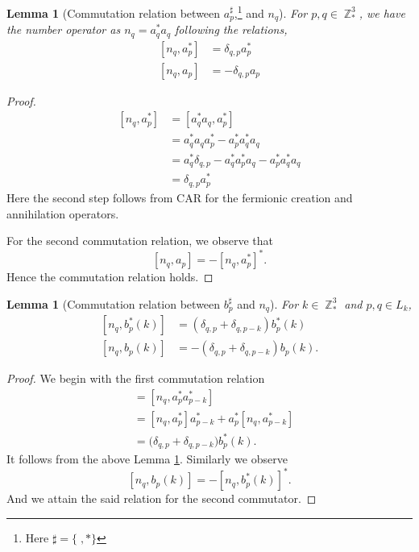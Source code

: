 \documentclass[sn-mathphys, Numbered ,a4paper]{sn-jnl}%
\DeclareMathOperator{\Z}{\mathbb{Z}}
\newcommand{\com}[1]{\left[ #1 \right]}
\theoremstyle{plain}
\newtheorem{lemma}[theorem]{Lemma}
\theoremstyle{definition}
\theoremstyle{remark}
\theoremstyle{plain}
\theoremstyle{definition}
\theoremstyle{remark}
\begin{document}
\begin{lemma}[Commutation relation between $a^\sharp_p$,\footnote{Here 
$\sharp = \{\;,*\} $} and $n_q$]\label{lem:coman}
For $p,q \in \Z^3_*$, we have the number operator as $n_q=a^*_q a_q$ following the relations,
    \begin{align}
        \com{n_q,a^*_p} &= \delta_{q,p}a^*_p\\
        \com{n_q,a_p} &= -\delta_{q,p}a_p
    \end{align}
\end{lemma} 
\begin{proof}
    \begin{align}
        \com{n_q,a^*_p} &= \com{a^*_qa_q,a^*_p}\nonumber\\
        &=a^*_qa_qa^*_p - a^*_pa^*_qa_q\nonumber\\
        &= a^*_q\delta_{q,p}- a^*_qa^*_pa_q - a^*_pa^*_qa_q\nonumber\\
        &=\delta_{q,p}a^*_p
    \end{align}
    Here the second step follows from CAR for the fermionic creation and annihilation operators.
    
For the second commutation relation, we observe that 
    \begin{equation}
        \com{n_q,a_p}= -\com{n_q,a^*_p}^*.
    \end{equation}
Hence the commutation relation holds.
\end{proof}
\begin{lemma}[Commutation relation between $b^\sharp_p$ and $n_q$]
  For $k \in \Z^3_*$ and $p,q \in L_{k}$,
    \begin{align}
        \com{n_q,b^*_p(k)} &= \left(\delta_{q,p}+\delta_{q,p-k}\right)b^*_p(k)\\
        \com{n_q,b_p(k)} &= -\left(\delta_{q,p}+\delta_{q,p-k}\right)b_p(k).
    \end{align}
\end{lemma} 
\begin{proof} We begin with the first commutation relation
    \begin{align}
        [n_q,b^*_p(k)] &= [n_q,a^*_pa^*_{p-k}]\nonumber\\
        &=[n_q,a^*_p]a^*_{p-k}+a^*_p[n_q,a^*_{p-k}]\nonumber\\
        &=\big(\delta_{q,p} +\delta_{q,p-k}\big)b^*_p(k).
    \end{align}
    It follows from the above Lemma \ref{lem:coman}. Similarly we observe
    \begin{equation}
         \com{n_q,b_p(k)}= -\com{n_q,b^*_p(k)}^*.
    \end{equation}
    And we attain the said relation for the second commutator.
\end{proof}
\end{document}
